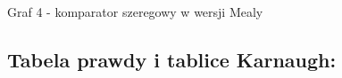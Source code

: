 \documentclass[12pt,a4paper]{article}
\begin{document}
			\vspace{1.5cm}
			\begin{center}
				Graf 4 - komparator szeregowy w wersji Mealy
			\end{center}
	
		\subsection{Tabela prawdy i tablice Karnaugh:}
\end{document}
